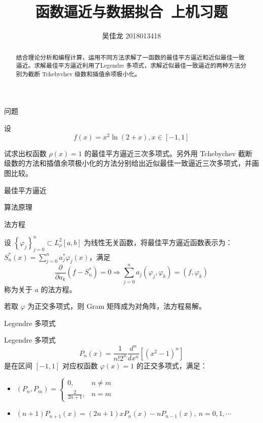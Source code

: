 \documentclass[a4paper]{article}
\providecommand{\keywords}[1]{\textbf{\textit{关键词}} #1}
\begin{document}
 
\title{函数逼近与数据拟合\ 上机习题}
\author{吴佳龙 2018013418}
\date{}
\maketitle

\begin{abstract}
	结合理论分析和编程计算，运用不同方法求解了一函数的最佳平方逼近和近似最佳一致逼近。求解最佳平方逼近利用了Legendre 多项式，求解近似最佳一致逼近的两种方法分别为截断 Tchebychev 级数和插值余项极小化。
\end{abstract}


\begin{multicols}{2}

\begin{section}{问题}

	设 $$f(x)=x^{2} \ln (2+x), x \in[-1,1]$$ 
	
	试求出权函数 $\rho(x)=1$ 的最佳平方逼近三次多项式。另外用 Tchebychev 截断级数的方法和插值余项极小化的方法分别给出近似最佳一致逼近三次多项式，并画图比较。

\end{section}

\begin{section}{最佳平方逼近}

	\begin{subsection}{算法原理}
		
		\begin{subsubsection}{法方程}
		
			设 $\left\{\varphi_{j}\right\}_{j=0}^{n} \subset L_{\rho}^{2}[a, b]$ 为线性无关函数，将最佳平方逼近函数表示为：$S_{n}^{*}(x)=\sum_{j=0}^{n} a_{j}^{*} \varphi_{j}(x)$，满足 $$\frac{\partial}{\partial a_{k}}(f-S_{n}^{*})=0 \Longrightarrow \sum_{j=0}^{n} a_{j}\left(\varphi_{j}, \varphi_{k}\right)=\left(f, \varphi_{k}\right)$$ 称为关于 $a$ 的法方程。
			
			若取 $\varphi$ 为正交多项式，则 Gram 矩阵成为对角阵，法方程易解。
			
		\end{subsubsection}

		\begin{subsubsection}{Legendre 多项式}
		
			Legendre 多项式 $$P_{n}(x)=\frac{1}{n ! 2^{n}} \frac{d^{n}}{d x^{n}}\left[\left(x^{2}-1\right)^{n}\right]$$ 是在区间 $[-1,1]$ 对应权函数 $\varphi(x) = 1$ 的正交多项式，满足：
			
			\begin{itemize}
				\item $\left(P_{n}, P_{m}\right) =\left\{\begin{array}{ll}{0,} & {n \neq m} \\ {\frac{2}{2 n+1},} & {n=m}\end{array}\right.$
				\item $(n+1) P_{n+1}(x)=(2 n+1) x P_{n}(x)-n P_{n-1}(x),\  n=0,1, \cdots $
			\end{itemize}
			

\end{subsubsection}
\end{subsection}
\end{section}
\end{multicols}
\end{document}
